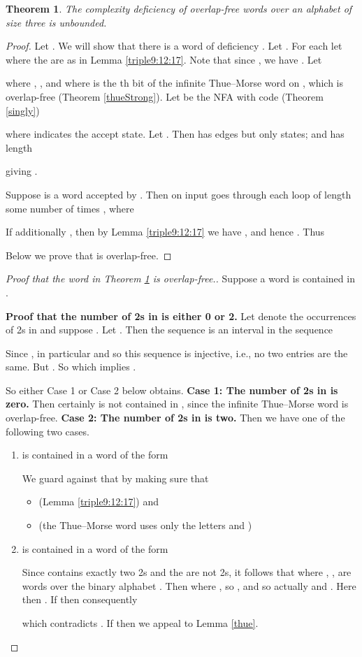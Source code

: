 \documentclass[12pt]{article}
\theoremstyle{plain}
\newtheorem{thm}{Theorem}
\theoremstyle{definition}
\theoremstyle{remark}
\begin{document}
			\begin{thm}\label{unbounded}
				The complexity deficiency of overlap-free words over an alphabet of size three is unbounded.
			\end{thm}
			\begin{proof}
				Let . We will show that there is a word  of deficiency . Let .
				For each  let  where the  are as in Lemma \ref{triple9:12:17}.
				Note that since , we have .
				Let
				
				
				where , , and
				where  is the th bit of the infinite Thue--Morse word on , which is overlap-free (Theorem \ref{thueStrong}).
				Let  be the NFA with code (Theorem \ref{singly})
				
				where  indicates the accept state. Let .
				Then  has  edges but only  states; and  has length
				
				giving .
				
				Suppose  is a word accepted by . Then  on input  goes through each
				loop of length  some number of times , where
				
				If additionally , then by Lemma \ref{triple9:12:17} we have , and hence .
				Thus
				
				Below we prove that  is overlap-free.
			\end{proof}
			\begin{proof}[Proof that the word  in Theorem \ref{unbounded} is overlap-free.]
				Suppose a word  is contained in .
			
				\textbf{Proof that the number of 2s in  is either 0 or 2.}
				Let  denote the occurrences of 2s in  and suppose .
				Let .
				Then the sequence  is an interval in the sequence
				
				Since , in particular  and so this sequence is injective, i.e.,
				no two entries are the same.
				But .
				So  which implies .

				So either Case 1 or Case 2 below obtains.
				\textbf{Case 1: The number of 2s in  is zero.} Then certainly  is not contained in ,
				since the infinite Thue--Morse word is overlap-free.
				\textbf{Case 2: The number of 2s in  is two.}
				Then we have one of the following two cases.
				\begin{enumerate}
					\item  is contained in a word of the form
						
						We guard against that by making sure that
						\begin{itemize}
							\item{}  (Lemma \ref{triple9:12:17}) and
							\item{}  (the Thue--Morse word uses only the letters  and )
						\end{itemize}
					\item  is contained in a word of the form
						
						Since  contains exactly two 2s and the  are not 2s, it follows that
						 where , ,  are words over the
						binary alphabet .
						Then  where , so ,  and so actually  and .
						Here then .
						If  then consequently
						
						which contradicts . If  then we appeal to Lemma \ref{thue}.
				\end{enumerate}
			\end{proof}
\end{document}
